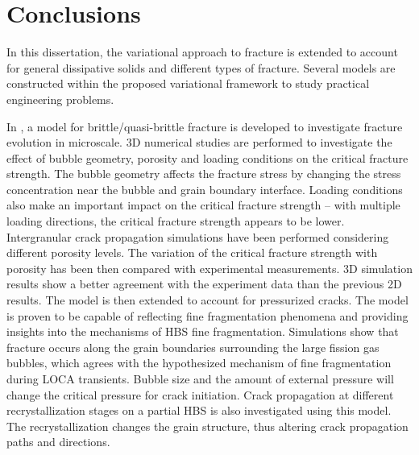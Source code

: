 \chapter{Conclusions}
\label{section: Chapter6}

In this dissertation, the variational approach to fracture is extended to account for general dissipative solids and different types of fracture. Several models are constructed within the proposed variational framework to study practical engineering problems.

In , a model for brittle/quasi-brittle fracture is developed to investigate fracture evolution in microscale. 3D numerical studies are performed to investigate the effect of bubble geometry, porosity and loading conditions on the critical fracture strength. The bubble geometry affects the fracture stress by changing the stress concentration near the bubble and grain boundary interface. Loading conditions also make an important impact on the critical fracture strength -- with multiple loading directions, the critical fracture strength appears to be lower. Intergranular crack propagation simulations have been performed considering different porosity levels. The variation of the critical fracture strength with porosity has been then compared with experimental measurements. 3D simulation results show a better agreement with the experiment data than the previous 2D results. The model is then extended to account for pressurized cracks. The model is proven to be capable of reflecting fine fragmentation phenomena and providing insights into the mechanisms of HBS fine fragmentation. Simulations show that fracture occurs along the grain boundaries surrounding the large fission gas bubbles, which agrees with the hypothesized mechanism of fine fragmentation during LOCA transients. Bubble size and the amount of external pressure will change the critical pressure for crack initiation. Crack propagation at different recrystallization stages on a partial HBS is also investigated using this model. The recrystallization changes the grain structure, thus altering crack propagation paths and directions.

